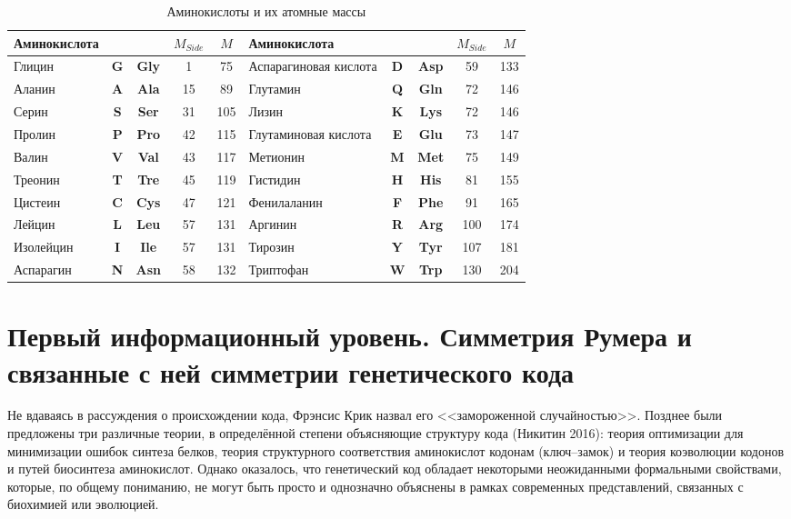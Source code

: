 \documentclass[12pt]{article}
\begin{document}
\begin{table}[htbp]
\centering
\caption{Аминокислоты и их атомные массы}
\label{tab:amino_acids}
\begin{tabular}{|l|c|c|c|c||l|c|c|c|c|}
\hline
\textbf{Аминокислота} & & & $M_{Side}$ & $M$ & \textbf{Аминокислота} & & & $M_{Side}$ & $M$ \\
\hline
Глицин & \textbf{G} & \textbf{Gly} & 1 & 75 & Аспарагиновая кислота & \textbf{D} & \textbf{Asp} & 59 & 133 \\
Аланин & \textbf{A} & \textbf{Ala} & 15 & 89 & Глутамин & \textbf{Q} & \textbf{Gln} & 72 & 146 \\
Серин & \textbf{S} & \textbf{Ser} & 31 & 105 & Лизин & \textbf{K} & \textbf{Lys} & 72 & 146 \\
Пролин & \textbf{P} & \textbf{Pro} & 42 & 115 & Глутаминовая кислота & \textbf{E} & \textbf{Glu} & 73 & 147 \\
Валин & \textbf{V} & \textbf{Val} & 43 & 117 & Метионин & \textbf{M} & \textbf{Met} & 75 & 149 \\
Треонин & \textbf{T} & \textbf{Tre} & 45 & 119 & Гистидин & \textbf{H} & \textbf{His} & 81 & 155 \\
Цистеин & \textbf{C} & \textbf{Cys} & 47 & 121 & Фенилаланин & \textbf{F} & \textbf{Phe} & 91 & 165 \\
Лейцин & \textbf{L} & \textbf{Leu} & 57 & 131 & Аргинин & \textbf{R} & \textbf{Arg} & 100 & 174 \\
Изолейцин & \textbf{I} & \textbf{Ile} & 57 & 131 & Тирозин & \textbf{Y} & \textbf{Tyr} & 107 & 181 \\
Аспарагин & \textbf{N} & \textbf{Asn} & 58 & 132 & Триптофан & \textbf{W} & \textbf{Trp} & 130 & 204 \\
\hline
\end{tabular}
\end{table}


\section{Первый информационный уровень. Симметрия Румера и связанные с ней симметрии генетического кода}

Не вдаваясь в рассуждения о происхождении кода, Фрэнсис Крик назвал его <<замороженной случайностью>>. Позднее были предложены три различные теории, в определённой степени объясняющие структуру кода (Никитин 2016): теория оптимизации для минимизации ошибок синтеза белков, теория структурного соответствия аминокислот кодонам (ключ--замок) и теория коэволюции кодонов и путей биосинтеза аминокислот. Однако оказалось, что генетический код обладает некоторыми неожиданными формальными свойствами, которые, по общему пониманию, не могут быть просто и однозначно объяснены в рамках современных представлений, связанных с биохимией или эволюцией.
\end{document}
